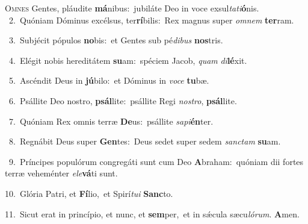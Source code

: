 \lettrine{\initial\textcolor{\initialcolor}{O}}{mnes} Gentes, pláudite \textbf{má}\-nibus:~\star jubiláte Deo in voce exsul\-\textit{ta}\-\textit{ti}\textbf{ó}nis.\\
{\numbfont\textcolor{\numbcolor}{~2.}}~Quóniam Dóminus excélsus, ter\-\textbf{rí}\-bilis:~\star Rex magnus super \textit{om}\-\textit{nem} \textbf{ter}\-ram.\par
{\numbfont\textcolor{\numbcolor}{~3.}}~Subjécit pópulos \textbf{no}\-bis:~\star et Gentes sub pé\-\textit{di}\-\textit{bus} \textbf{nos}\-tris.\par
{\numbfont\textcolor{\numbcolor}{~4.}}~Elégit nobis hereditátem \textbf{su}\-am:~\star spéciem Jacob, \textit{quam} \textit{di}\-\textbf{lé}xit.\par
{\numbfont\textcolor{\numbcolor}{~5.}}~Ascéndit Deus in \textbf{jú}\-bilo:~\star et Dóminus in \textit{vo}\-\textit{ce} \textbf{tu}\-bæ.\par
{\numbfont\textcolor{\numbcolor}{~6.}}~Psállite Deo nostro, \textbf{psál}\-lite:~\star psállite Regi \textit{nos}\-\textit{tro}, \textbf{psál}\-lite.\par
{\numbfont\textcolor{\numbcolor}{~7.}}~Quóniam Rex omnis terræ \textbf{De}\-us:~\star psállite \textit{sa}\-\textit{pi}\textbf{én}ter.\par
{\numbfont\textcolor{\numbcolor}{~8.}}~Regnábit Deus super \textbf{Gen}\-tes:~\star Deus sedet super sedem \textit{sanc}\-\textit{tam} \textbf{su}\-am.\par
{\numbfont\textcolor{\numbcolor}{~9.}}~Príncipes populórum congregáti sunt cum Deo \textbf{A}\-braham:~\star quóniam dii fortes terræ veheménter \textit{e}\-\textit{le}\textbf{vá}ti sunt.\par
{\numbfont\textcolor{\numbcolor}{10.}}~Glória Patri, et \textbf{Fí}\-lio,~\star et Spirí\-\textit{tu}\-\textit{i} \textbf{Sanc}\-to.\par
{\numbfont\textcolor{\numbcolor}{11.}}~Sicut erat in princípio, et nunc, et \textbf{sem}\-per,~\star et in sǽcula sæcu\-\textit{ló}\-\textit{rum}. \textbf{A}\-men.\par
